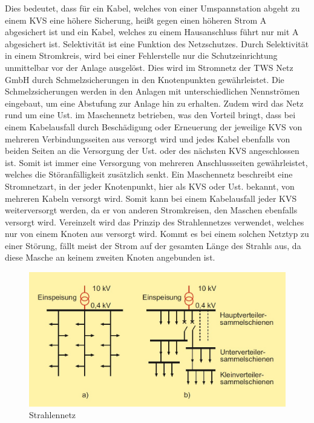 Dies bedeutet, dass für ein Kabel, welches von einer Umspannstation abgeht zu einem KVS eine höhere Sicherung, heißt gegen einen höheren Strom  A 
abgesichert ist und ein Kabel, welches zu einem Hausanschluss führt nur mit  A abgesichert ist. Selektivität ist eine Funktion des Netzschutzes. 
Durch Selektivität in einem Stromkreis, wird bei einer Fehlerstelle nur die Schutzeinrichtung unmittelbar vor der Anlage ausgelöst. Dies wird im Stromnetz 
der TWS Netz GmbH durch Schmelzsicherungen in den Knotenpunkten gewährleistet. Die Schmelzsicherungen werden in den Anlagen mit unterschiedlichen 
Nennströmen eingebaut, um eine Abstufung zur Anlage hin zu erhalten.  Zudem wird das Netz rund um eine Ust. im Maschennetz betrieben, was den Vorteil 
bringt, dass bei einem Kabelausfall durch Beschädigung oder Erneuerung der jeweilige KVS von mehreren Verbindungsseiten aus versorgt wird und jedes Kabel 
ebenfalls von beiden Seiten an die Versorgung der Ust. oder des nächsten KVS angeschlossen ist. Somit ist immer eine Versorgung von mehreren 
Anschlussseiten gewährleistet, welches die Störanfälligkeit zusätzlich senkt. Ein Maschennetz beschreibt eine Stromnetzart, in der jeder Knotenpunkt, 
hier als KVS oder Ust. bekannt, von mehreren Kabeln versorgt wird. Somit kann bei einem Kabelausfall jeder KVS weiterversorgt werden, da er von anderen 
Stromkreisen, den Maschen ebenfalls versorgt wird. Vereinzelt wird das Prinzip des Strahlennetzes  verwendet, welches nur von einem Knoten aus versorgt 
wird. Kommt es bei einem solchen Netztyp zu einer Störung, fällt meist der Strom auf der gesamten Länge des Strahls aus, da diese Masche an keinem zweiten 
Knoten angebunden ist. \autocite{Schwab.2012}
\begin{figure}[hbt]
    \centering
    \includegraphics[width=0.98\linewidth]{images/Strahlennetz}
    \caption[Strahlennetz]{Strahlennetz \autocite{Schwab.2012}}
    \label{fig:Strahlennetz}
\end{figure}
